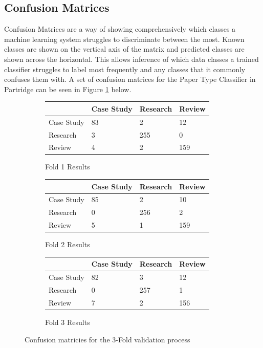 \subsection{ Confusion Matrices}

Confusion Matrices are a way of showing comprehensively which classes a machine
learning system struggles to discriminate between the most. Known classes are
shown on the vertical axis of the matrix and predicted classes are shown across
the horizontal. This allows inference of which data classes a trained
classifier struggles to label most frequently and any classes that it commonly
confuses them with. A set of confusion matrices for the Paper Type Classifier
in Partridge can be seen in Figure \ref{fig:conf_matrices} below.

\begin{figure}[!h]

\centering

\begin{subfigure}[b]{\textwidth}

\caption{Fold 1 Results}
\centering
\begin{tabular}{| l || l | l | l |}
\hline
	&	Case Study&	Research&	Review\\
\hline
\hline
Case Study&	83&		2&		12\\
\hline
Research&	3&		255&		0\\
\hline
Review&		4&		2&		159\\
\hline

\end{tabular}
\end{subfigure}


\begin{subfigure}[b]{\textwidth}

\caption{Fold 2 Results}
\centering
\begin{tabular}{| l || l | l | l |}
\hline
&	        Case Study&     Research&	Review\\
\hline
\hline
Case Study&     85    &         2&		10\\
\hline
Research&	0   &		256&		2\\
\hline
Review&		5&		1&		159\\
\hline
\end{tabular}

\end{subfigure}

\begin{subfigure}[b]{\textwidth}

\caption{Fold 3 Results}
\centering
\begin{tabular}{| l || l | l | l |}
\hline
&		Case Study&	Research&	Review\\
\hline
\hline
Case Study&	82&		3	&	12 \\
Research&	0&		257	&	1\\
Review&		7&		2	&	156\\
\hline
\end{tabular}

\end{subfigure}

\caption{ Confusion matricies for the 3-Fold validation process}
\label{fig:conf_matrices}

\end{figure}

